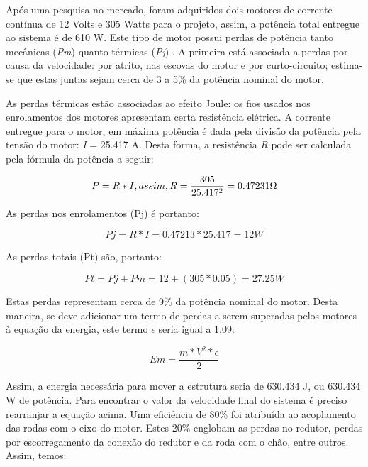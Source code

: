   Após uma pesquisa no mercado, foram adquiridos dois motores de corrente contínua de 12 Volts e 305 Watts para o projeto, assim, a potência total entregue ao sistema é de 610 W. Este tipo de motor possui perdas de potência tanto mecânicas (\textit{Pm}) quanto térmicas (\textit{Pj}) \cite{perdas}. A primeira está associada a perdas por causa da velocidade: por atrito, nas escovas do motor e por curto-circuito; estima-se que estas juntas sejam cerca de 3 a 5\% da potência nominal do motor.

  As perdas térmicas estão associadas ao efeito Joule: os fios usados nos enrolamentos dos motores apresentam certa resistência elétrica. A corrente entregue para o motor, em máxima potência é dada pela divisão da potência pela tensão do motor: \textit{I} = 25.417 A. Desta forma, a resistência \textit{R} pode ser calculada pela fórmula da potência a seguir:

  \begin{equation}
  P = R*I, assim, R = \frac{305}{25.417^2} = 0.47231 \ohm
  \end{equation}

  As perdas nos enrolamentos (Pj) é portanto:

  \begin{equation}
  Pj = R*I = 0.47213*25.417 = 12 W
  \end{equation}

  As perdas totais (Pt) são, portanto:

  \begin{equation}
  Pt = Pj+Pm = 12+(305*0.05) = 27.25 W
  \end{equation}

  Estas perdas representam cerca de 9\% da potência nominal do motor. Desta maneira, se deve adicionar um termo de perdas a serem superadas pelos motores à equação da energia, este termo $\epsilon$ seria igual a 1.09:

  \begin{equation}
    Em = \frac{m*V^2*\epsilon}{2}
  \end{equation}

  Assim, a energia necessária para mover a estrutura seria de 630.434 J, ou 630.434 W de potência. Para encontrar o valor da velocidade final do sistema é preciso rearranjar a equação acima. Uma eficiência de 80\% foi atribuída ao acoplamento das rodas com o eixo do motor. Estes 20\% englobam as perdas no redutor, perdas por escorregamento da conexão do redutor e da roda com o chão, entre outros. Assim, temos:

